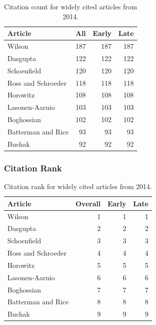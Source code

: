 \documentclass[
  10pt,
  letterpaper,
  DIV=11,
  numbers=noendperiod,
  twoside]{scrartcl}
\begin{document}
\begin{longtable}[]{@{}lrrr@{}}

\caption{\label{tbl-citation-count-2014}Citation count for widely cited
articles from 2014.}

\tabularnewline

\toprule\noalign{}
Article & All & Early & Late \\
\midrule\noalign{}
\endhead
\bottomrule\noalign{}
\endlastfoot
Wilson & 187 & 187 & 187 \\
Dasgupta & 122 & 122 & 122 \\
Schoenfield & 120 & 120 & 120 \\
Ross and Schroeder & 118 & 118 & 118 \\
Horowitz & 108 & 108 & 108 \\
Lasonen-Aarnio & 103 & 103 & 103 \\
Boghossian & 102 & 102 & 102 \\
Batterman and Rice & 93 & 93 & 93 \\
Buchak & 92 & 92 & 92 \\

\end{longtable}

\subsubsection*{Citation Rank}\label{citation-rank-38}

\begin{longtable}[]{@{}lrrr@{}}

\caption{\label{tbl-citation-rank-2014}Citation rank for widely cited
articles from 2014.}

\tabularnewline

\toprule\noalign{}
Article & Overall & Early & Late \\
\midrule\noalign{}
\endhead
\bottomrule\noalign{}
\endlastfoot
Wilson & 1 & 1 & 1 \\
Dasgupta & 2 & 2 & 2 \\
Schoenfield & 3 & 3 & 3 \\
Ross and Schroeder & 4 & 4 & 4 \\
Horowitz & 5 & 5 & 5 \\
Lasonen-Aarnio & 6 & 6 & 6 \\
Boghossian & 7 & 7 & 7 \\
Batterman and Rice & 8 & 8 & 8 \\
Buchak & 9 & 9 & 9 \\

\end{longtable}
\end{document}
